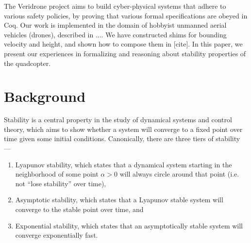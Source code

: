 \documentclass[10pt]{sigplanconf}
\begin{document}


The Veridrone project aims to build cyber-physical systems that adhere to various safety policies, by proving that various formal specifications are obeyed in Coq. Our work is implemented in the domain of hobbyist unmanned aerial vehicles (drones), described in .... We have constructed shims for bounding velocity and height, and shown how to compose them in [cite]. In this paper, we present our experiences in formalizing and reasoning about stability properties of the quadcopter.





\section{Background}


Stability is a central property in the study of dynamical systems and control theory, which aims to show whether a system will converge to a fixed point over time given some initial conditions. Canonically, there are three tiers of stability ---

\begin{enumerate}
\item Lyapunov stability, which states that a dynamical system starting in the neighborhood of some point $\alpha > 0$ will always circle around that point (i.e. not ``lose stability'' over time),

\item  Asymptotic stability, which states that a Lyapunov stable system will converge to the stable point over time, and

\item  Exponential stability, which states that an asymptotically stable system will converge exponentially fast.
\end{enumerate}
\end{document}
